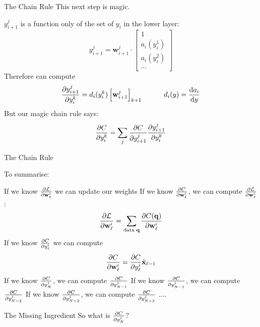 \documentclass[]{SangerLibrary/sanger-present}
\renewcommand\vec[1]{\boldsymbol{\mathbf{#1}}}
\begin{document}
	

	\begin{frame}{The Chain Rule}
		This next step is magic.

		\begin{enumerate}
			\pitem $y_{i+1}^j$ is a function only of the set of $y_i$ in the lower layer:
			$$ y_{i+1}^j = \vec{w}_{i+1}^j \cdot \begin{bmatrix}
				1 \\ a_{i}(y_i^1) \\ a_{i}(y_i^2) \\ \cdots
			\end{bmatrix}$$
			\pitem Therefore can compute
			$$ \pdiv{y_{i+1}^j}{y_i^k} = d_i(y_i^k) \left[ \vec{w}_{i+1}^j \right]_{k+1}~~~~~~~~~d_i(y) = \div{a_i}{y}$$
			\pitem But our magic chain rule says:
			$$\frac{\partial C}{\partial y_i^k} = \sum_j \frac{\partial C}{\partial y_{i+1}^j} \frac{\partial y_{i+1}^j}{\partial y_i^k}$$

		\end{enumerate} 
	\end{frame}

	\begin{frame}{The Chain Rule}

		To summarise:
		\begin{itemize}
		\pitem If we know $ \pdiv{\mathcal{L}}{\vec{w}_\ell^i}$ we can update our weights
		\pitem If we know  $\pdiv{C}{\vec{w}_\ell^i}$, we can compute $ \pdiv{\mathcal{L}}{\vec{w}_\ell^i}$:
		$$ \pdiv{\mathcal{L}}{\vec{w}_\ell^i} = \sum_\text{data $\vec{q}$} \pdiv{C(\vec{q})}{\vec{w}_\ell^i}$$
		\pitem If we know $\frac{\partial C}{\partial y_\ell^i}$ we can compute
		$$ \pdiv{C}{\vec{w}_\ell^i} = \pdiv{C}{y_\ell^i} \tilde{\vec{x}}_{\ell-1}$$
		\pitem If we know $\frac{\partial C}{\partial y_{N}^j}$, we can compute $\frac{\partial C}{\partial y_{N-1}^j}$
		\pitem If we know $\frac{\partial C}{\partial y_{N-1}^j}$, we can compute $\frac{\partial C}{\partial y_{N-2}^j}$
		\pitem If we know $\frac{\partial C}{\partial y_{N-2}^j}$, we can compute $\frac{\partial C}{\partial y_{N-3}^j}$
		\pitem ....
		\end{itemize}


	\end{frame}

	\begin{frame}{The Missing Ingredient}
		\centering So what is $\frac{\partial C}{\partial y_{N}^j}$?
	\end{frame}
\end{document}
